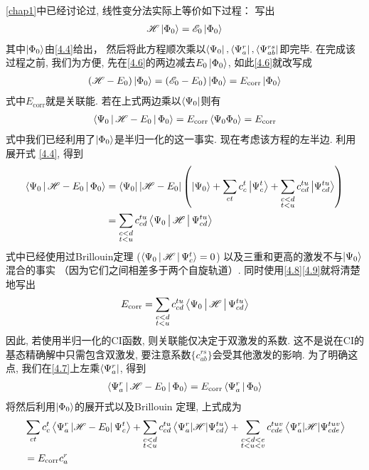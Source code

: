 \autoref*{chap1}中已经讨论过, 线性变分法实际上等价如下过程： 写出
\begin{align}
\mathscr{H}\Ket{\Phi_0} = \mathscr{E}_0\Ket{\Phi_0}
\label{4.6}
\end{align}
其中$ \Ket{\Phi_0} $由\eqref{4.4}给出， 然后将此方程顺次乘以$ \Bra{\Psi_0},\Bra{\Psi_a^r} ,\Bra{\Psi_{ab}^{rs}}$即完毕. 在完成该过程之前, 我们为方便, 先在\eqref{4.6}的两边减去$ E_0\Ket{\Phi_0} $, 如此\eqref{4.6}就改写成
\begin{align}
(\mathscr{H} -E_0)\Ket{\Phi_0} = (\mathscr{E}_0-E_0)\Ket{\Phi_0} = E_\mathrm{corr} \Ket{\Phi_0}
\label{4.7}
\end{align} 
式中$E_\mathrm{corr}$就是关联能. 若在上式两边乘以$\Bra{\Psi_0}$则有
\begin{align}
\Braket{\Psi_0|\mathscr{H}-E_0|\Phi_0} = E_\mathrm{corr} \Braket{\Psi_0\Phi_0} = E_\mathrm{corr}
\end{align}
式中我们已经利用了$\Ket{\Phi_0}$是半归一化的这一事实. 现在考虑该方程的左半边. 利用展开式 \eqref{4.4}, 得到
\begin{align}
\Braket{\Psi_0|\mathscr{H}-E_0|\Phi_0} & = \Bra{\Psi_0}|\mathscr{H}-E_0|\left( \Ket{\Psi_0} + \sum_{ct}c_c^t\Ket{\Psi_c^t} + \sum_{\substack{c<d\\t<u}} c_{cd}^{tu}\Ket{\Psi_{cd}^{tu}} \right)\notag \\
&=\sum_{\substack{c<d\\t<u}}c_{cd}^{tu}\Braket{\Psi_0|\mathscr{H}|\Psi_{cd}^{tu}}
\end{align}
式中已经使用过Brillouin定理 ($ \Braket{\Psi_0|\mathscr{H}|\Psi_c^t }=0$) 以及三重和更高的激发不与$\Ket{\Psi_0}$混合的事实 （因为它们之间相差多于两个自旋轨道）. 同时使用\eqref{4.8}\eqref{4.9}就将清楚地写出
\begin{align}
E_\mathrm{corr} = \sum_{\substack{c<d\\t<u}}c_{cd}^{tu}\Braket{\Psi_0|\mathscr{H}|\Psi_{cd}^{tu}}
\end{align}
因此, 若使用半归一化的CI函数, 则关联能仅决定于双激发的系数. 这不是说在CI的基态精确解中只需包含双激发, 要注意系数$ \{c_{ab}^{rs}\} $会受其他激发的影响. 为了明确这点, 我们在\eqref{4.7}上左乘$ \Bra{\Psi_a^r} $, 得到
\begin{align}
\Braket{\Psi_a^r|\mathscr{H}-E_0|\Phi_0} = E_\mathrm{corr} \Braket{\Psi_a^r|\Phi_0}
\label{4.10}
\end{align}
将然后利用$\Ket{\Phi_0}$的展开式以及Brillouin 定理, 上式成为
\begin{align}
&\sum_{c t} c_{c}^{t}\left\langle\Psi_{a}^{r}\left|\mathscr{H}-E_{0}\right| \Psi_{c}^{t}\right\rangle+\sum_{\substack{c<d \\ t<u}} c_{cd}^{t u}\left\langle\Psi_{a}^{r}|\mathscr{H}| \Psi_{c d}^{t u}\right\rangle+\sum_{\substack{c<d<e\\ t<u<v}} c_{c d e}^{t u v}\left\langle\Psi_{a}^{r}|\mathscr{H}| \Psi_{c d e}^{t u v}\right\rangle \notag \\
&=E_{\mathrm{corr}} c_{a}^{r}
\label{4.11}
\end{align}
